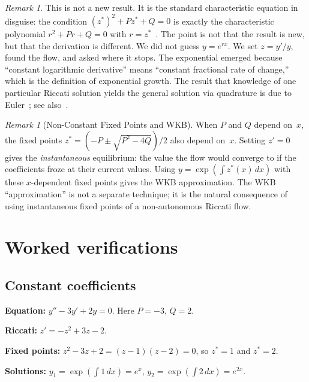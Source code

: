 \documentclass{amsart}
\theoremstyle{definition}
\theoremstyle{remark}
\newtheorem{remark}[theorem]{Remark}
\begin{document}
\begin{remark}
This is not a new result. It is the standard characteristic equation in disguise: the condition $(z^*)^2 + Pz^* + Q = 0$ is exactly the characteristic polynomial $r^2 + Pr + Q = 0$ with $r = z^*$~\cite{Ince1956, CodLev1955}. The point is not that the result is new, but that the derivation is different. We did not guess $y = e^{rx}$. We set $z = y'/y$, found the flow, and asked where it stops. The exponential emerged because ``constant logarithmic derivative'' means ``constant fractional rate of change,'' which is the definition of exponential growth. The result that knowledge of one particular Riccati solution yields the general solution via quadrature is due to Euler~\cite{Euler1762}; see also~\cite{Reid1972}.
\end{remark}

\begin{remark}[Non-Constant Fixed Points and WKB]
When $P$ and $Q$ depend on~$x$, the fixed points $z^* = (-P \pm \sqrt{P^2 - 4Q})/2$ also depend on~$x$. Setting $z' = 0$ gives the \emph{instantaneous} equilibrium: the value the flow would converge to if the coefficients froze at their current values. Using $y = \exp(\int z^*(x)\,dx)$ with these $x$-dependent fixed points gives the WKB approximation. The WKB ``approximation'' is not a separate technique; it is the natural consequence of using instantaneous fixed points of a non-autonomous Riccati flow.
\end{remark}

\section{Worked verifications}

\subsection{Constant coefficients}

\textbf{Equation:} $y'' - 3y' + 2y = 0$. Here $P = -3$, $Q = 2$.

\textbf{Riccati:} $z' = -z^2 + 3z - 2$.

\textbf{Fixed points:} $z^2 - 3z + 2 = (z-1)(z-2) = 0$, so $z^* = 1$ and $z^* = 2$.

\textbf{Solutions:} $y_1 = \exp(\int 1\,dx) = e^x$, \quad $y_2 = \exp(\int 2\,dx) = e^{2x}$.
\end{document}
